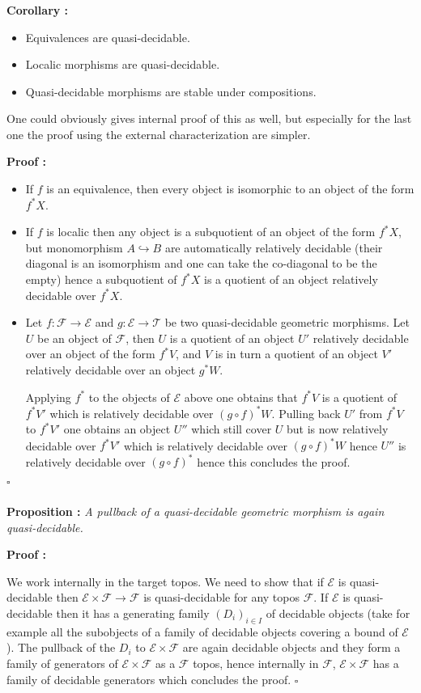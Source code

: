 \documentclass[a4paper]{article}
\newcommand{\Ecal}{\mathcal{E}}
\newcommand{\Tcal}{\mathcal{T}}
\newcommand{\Fcal}{\mathcal{F}}
\newcommand{\block}[1]
{

\par \subsubsection{} #1

\bigskip}
\newcommand{\Prop}[1]
	{

	\bigskip
	
	\textbf{Proposition : }{\itshape #1}
		
	\bigskip
	
	}
\newcommand{\Cor}[1]
	{

	\bigskip
	
	\textbf{Corollary : }{\itshape #1}	
		
	\bigskip

	}
\newcommand{\Dem}[1]{
	
	\smallskip
	
	\textbf{Proof : } \par
	 {#1} $\square$
	 
	 \bigskip
}
\begin{document}
\block{\Cor{\begin{itemize}

\item Equivalences are quasi-decidable.

\item Localic morphisms are quasi-decidable.

\item Quasi-decidable morphisms are stable under compositions.

\end{itemize}
}

One could obviously gives internal proof of this as well, but especially for the last one the proof using the external characterization are simpler.

\Dem{\begin{itemize}
\item If $f$ is an equivalence, then every object is isomorphic to an object of the form $f^* X$.

\item If $f$ is localic then any object is a subquotient of an object of the form $f^*X$, but monomorphism $A \hookrightarrow B$ are automatically relatively decidable (their diagonal is an isomorphism and one can take the co-diagonal to be the empty) hence a subquotient of $f^* X$ is a quotient of an object relatively decidable over $f^*X$.

\item Let $f:\Fcal \rightarrow \Ecal$ and $g: \Ecal \rightarrow \Tcal$ be two quasi-decidable geometric morphisms.  Let $U$ be an object of $\Fcal$, then $U$ is a quotient of an object $U'$ relatively decidable over an object of the form $f^* V$, and $V$ is in turn a quotient of an object $V'$ relatively decidable over an object $g^* W$.

Applying $f^*$ to the objects of $\Ecal$ above one obtains that $f^* V$ is a quotient of $f^* V'$ which is relatively decidable over $(g \circ f)^* W$. Pulling back $U'$ from $f^* V$ to $f^* V'$ one obtains an object $U''$ which still cover $U$ but is now relatively decidable over $f^*V'$ which is relatively decidable over $(g\circ f)^* W$ hence $U''$ is relatively decidable over $(g \circ f)^*$ hence this concludes the proof.

\end{itemize}

}}

\block{\Prop{A pullback of a quasi-decidable geometric morphism is again quasi-decidable.}

\Dem{We work internally in the target topos. We need to show that if $\Ecal$ is quasi-decidable then $\Ecal \times \Fcal \rightarrow \Fcal$ is quasi-decidable for any topos $\Fcal$. If $\Ecal$ is quasi-decidable then it has a generating family $(D_i)_{i \in I}$ of decidable objects (take for example all the subobjects of a family of decidable objects covering a bound of $\Ecal$). The pullback of the $D_i$ to $\Ecal \times \Fcal$ are again decidable objects and they form a family of generators of $\Ecal \times \Fcal$ as a $\Fcal$ topos, hence internally in $\Fcal$, $\Ecal \times \Fcal$ has a family of decidable generators which concludes the proof.
}
}
\end{document}
